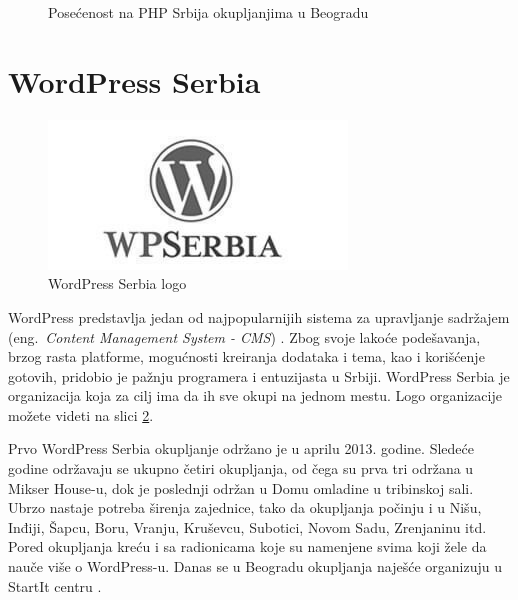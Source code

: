 \documentclass[a4paper]{article}
\begin{document}
{\begin{figure}
\centering
{}
\caption{Posećenost na PHP Srbija okupljanjima u Beogradu}
\label{fig:PHPgrafik}
\end{figure}

\section{WordPress Serbia}
\begin{figure}[h!]
\begin{center}
\includegraphics[scale=0.5]{wp.jpg}
\end{center}
\caption{WordPress Serbia logo}
\label{fig:wordpressLogo}
\end{figure}
WordPress predstavlja jedan od najpopularnijih sistema za upravljanje sadržajem (eng.~{\em Content Management System - CMS}) \cite{isitwp}. Zbog svoje lakoće podešavanja, brzog rasta platforme, mogućnosti kreiranja dodataka i tema, kao i korišćenje gotovih, pridobio je pažnju programera i entuzijasta u Srbiji. WordPress Serbia je organizacija koja za cilj ima da ih sve okupi na jednom mestu. Logo organizacije možete videti na slici \ref{fig:wordpressLogo}.

Prvo WordPress Serbia okupljanje održano je u aprilu 2013. godine. Sledeće godine održavaju se ukupno četiri okupljanja, od čega su prva tri održana u Mikser House-u, dok je poslednji održan u Domu omladine u tribinskoj sali. Ubrzo nastaje potreba širenja zajednice, tako da okupljanja počinju i u Nišu, Inđiji, Šapcu, Boru, Vranju, Kruševcu, Subotici, Novom Sadu, Zrenjaninu itd. Pored okupljanja kreću i sa radionicama koje su namenjene svima koji žele da nauče više o WordPress-u. Danas se u Beogradu okupljanja naješće organizuju u StartIt centru \cite{aboutStarit}.

}
\end{document}
